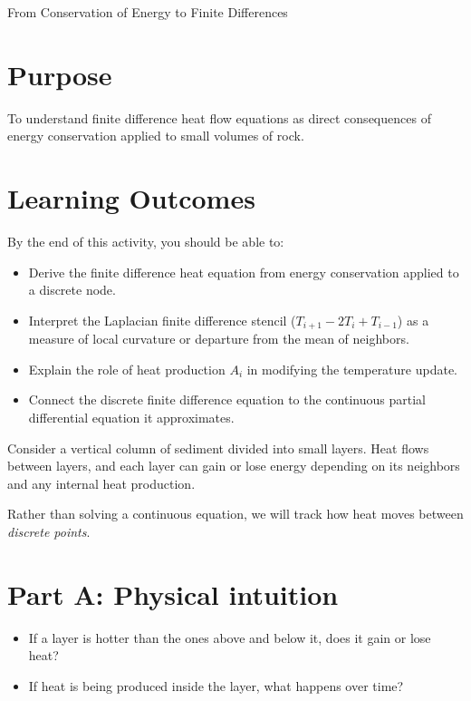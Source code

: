 \begin{activity}{From Conservation of Energy to Finite Differences}

\section*{Purpose}
To understand finite difference heat flow equations as direct consequences of energy conservation applied to small volumes of rock.

\section*{Learning Outcomes}

By the end of this activity, you should be able to:
\begin{itemize}
  \item Derive the finite difference heat equation from energy conservation applied to a discrete node.
  \item Interpret the Laplacian finite difference stencil ($T_{i+1} - 2T_i + T_{i-1}$) as a measure of local curvature or departure from the mean of neighbors.
  \item Explain the role of heat production $A_i$ in modifying the temperature update.
  \item Connect the discrete finite difference equation to the continuous partial differential equation it approximates.
\end{itemize}

Consider a vertical column of sediment divided into small layers. Heat flows between layers, and each layer can gain or lose energy depending on its neighbors and any internal heat production.

Rather than solving a continuous equation, we will track how heat moves between
\emph{discrete points}.

\section*{Part A: Physical intuition}

\begin{itemize}
    \item If a layer is hotter than the ones above and below it, does it gain or lose heat?
    \item If heat is being produced inside the layer, what happens over time?
\end{itemize}
\answerbox[3cm]


\end{activity}
